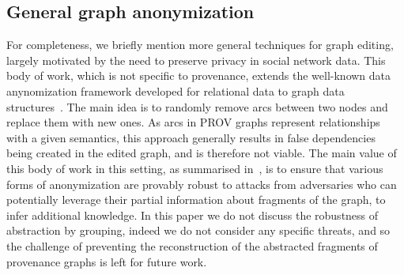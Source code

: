 
\subsection{General graph anonymization}

For completeness, we briefly mention more general techniques for graph editing, largely motivated by the need to preserve privacy in social network data. This body of work, which is not specific to provenance, extends the well-known data anynomization framework developed for relational data to graph data structures~\citep{springerlink:10.1007/978-3-540-78478-4_9,Bhagat:2009:CGA:1687627.1687714,Liu:2008:TIA:1376616.1376629}. The main idea is to randomly remove arcs between two nodes and replace them with new ones. As arcs in PROV graphs represent relationships with a given semantics, this approach generally results in false dependencies being created in the edited graph, and is therefore not viable. 
%
The main value of this body of work in this setting, as summarised in~\citep{Zhou:2008:BSA:1540276.1540279}, is to ensure that various forms of anonymization are provably robust to attacks from adversaries who can potentially leverage their partial information about fragments of the graph, to infer additional knowledge. In this paper we do not discuss the robustness of abstraction by grouping, indeed we do not consider any specific threats, and so the challenge of preventing the reconstruction of the abstracted fragments of provenance graphs is left for future work.



